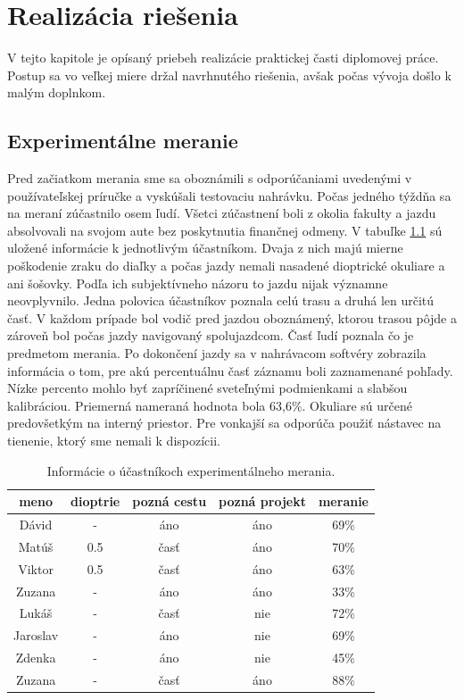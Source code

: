 \chapter{Realizácia riešenia}\label{chap:research}

V tejto kapitole je opísaný priebeh realizácie praktickej časti diplomovej práce. Postup sa vo veľkej miere držal navrhnutého riešenia, avšak počas vývoja došlo k malým doplnkom.

\section{Experimentálne meranie}

Pred začiatkom merania sme sa oboznámili s odporúčaniami uvedenými v používateľskej príručke a vyskúšali testovaciu nahrávku. Počas jedného týždňa sa na meraní zúčastnilo osem ľudí. Všetci zúčastnení boli z okolia fakulty a jazdu absolvovali na svojom aute bez poskytnutia finančnej odmeny. V tabuľke \ref{table:1} sú uložené informácie k jednotlivým účastníkom. Dvaja z nich majú mierne poškodenie zraku do diaľky a počas jazdy nemali nasadené dioptrické okuliare a ani šošovky. Podľa ich subjektívneho názoru to jazdu nijak významne neovplyvnilo. Jedna polovica účastníkov poznala celú trasu a druhá len určitú časť. V každom prípade bol vodič pred jazdou oboznámený, ktorou trasou pôjde a zároveň bol počas jazdy navigovaný spolujazdcom. Časť ľudí poznala čo je predmetom merania. Po dokončení jazdy sa v nahrávacom softvéry zobrazila informácia o tom, pre akú percentuálnu časť záznamu boli zaznamenané pohľady. Nízke percento mohlo byť zapríčinené sveteľnými podmienkami a slabšou kalibráciou. Priemerná nameraná hodnota bola 63,6\%. Okuliare sú určené predovšetkým na interný priestor. Pre vonkajší sa odporúča použiť nástavec na tienenie, ktorý sme nemali k dispozícii.


\begin{table}
\centering
\begin{tabular}{ |c c c c c|  }
\hline
meno & dioptrie & pozná cestu & pozná projekt & meranie \\
\hline
Dávid & - & áno & áno & 69\% \\
Matúš & 0.5 & časť & áno & 70\% \\
Viktor & 0.5 & časť & áno & 63\% \\
Zuzana & - & áno & áno & 33\% \\
Lukáš & - & časť & nie & 72\% \\
Jaroslav & - & áno & nie & 69\% \\
Zdenka & - & áno & nie & 45\% \\
Zuzana & - & časť & áno & 88\% \\
\hline
\end{tabular}
\caption{Informácie o účastníkoch experimentálneho merania.}
\label{table:1}
\end{table}


